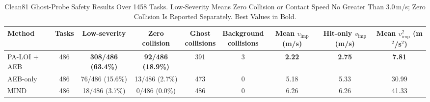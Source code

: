 \begin{table}[t]
\caption{Clean81 Ghost-Probe Safety Results Over 1458 Tasks. Low-Severity Means Zero Collision or Contact Speed No Greater Than 3.0\,m/s; Zero Collision Is Reported Separately. Best Values in Bold.}
\label{tab:main-safety}
\centering
\scriptsize
\setlength{\tabcolsep}{7pt}
\begin{tabular}{lcccccccc}
\toprule
Method & Tasks & Low-severity & Zero collision & \makecell{Ghost\\collisions} & \makecell{Background\\collisions} & \makecell{Mean $v_{\mathrm{imp}}$\\(m/s)} & \makecell{Hit-only $v_{\mathrm{imp}}$\\(m/s)} & \makecell{Mean $v_{\mathrm{imp}}^2$\\(m$^2$/s$^2$)} \\
\midrule
PA-LOI + AEB & 486 & \textbf{308/486 (63.4\%)} & \textbf{92/486 (18.9\%)} & 391 & 3 & \textbf{2.22} & \textbf{2.75} & \textbf{7.81} \\
AEB-only & 486 & 76/486 (15.6\%) & 13/486 (2.7\%) & 473 & 0 & 5.18 & 5.33 & 30.99 \\
MIND & 486 & 18/486 (3.7\%) & 0/486 (0.0\%) & 486 & 0 & 6.26 & 6.26 & 41.33 \\
\bottomrule
\end{tabular}
\end{table}
